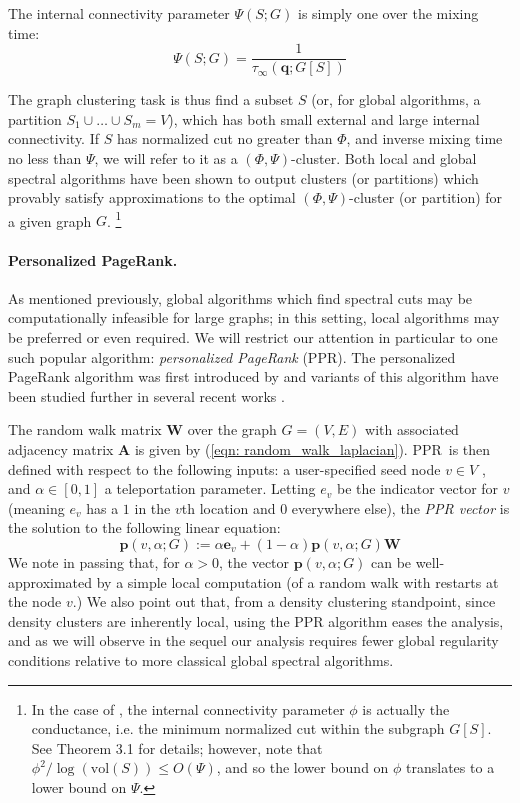 \documentclass{article}
\newcommand{\vol}{\mathrm{vol}}
\newcommand{\1}{\mathbf{1}}
\newcommand{\pbf}{\mathbf{p}}
\newcommand{\qbf}{\mathbf{q}}
\newcommand{\ebf}[1]{\mathbf{e}_{#1}}
\newcommand{\Abf}{\mathbf{A}}
\newcommand{\Wbf}{\mathbf{W}}
\newcommand{\ppr}{{\sc PPR}}
\newcommand{\pprspace}{{\sc PPR~}}
\theoremstyle{aldenthm}
\theoremstyle{aldenrmrk}
\begin{document}
The internal connectivity parameter $\Psi(S; G)$ is simply one over the mixing time:
\begin{equation}
\label{eqn: inv_mixing_time}
\Psi(S; G) = \frac{1}{\tau_{\infty}(\qbf; G[S])}
\end{equation}

The graph clustering task is thus find a subset $S$ (or, for global algorithms, a partition $S_1 \cup \ldots \cup S_m = V$), which has both small external and large internal connectivity. If $S$ has normalized cut no greater than $\Phi$, and inverse mixing time no less than $\Psi$, we will refer to it as a $(\Phi,\Psi)$-cluster. Both local \cite{zhu2013} and global \cite{kannan04} spectral algorithms have been shown to output clusters (or partitions) which provably satisfy approximations to the optimal $(\Phi, \Psi)$-cluster (or partition) for a given graph $G$. \footnote{In the case of \cite{kannan04}, the internal connectivity parameter $\phi$ is actually the conductance, i.e. the minimum normalized cut within the subgraph $G[S]$. See Theorem 3.1 for details; however, note that $\phi^2 / \log(\vol(S)) \leq O(\Psi)$, and so the lower bound on $\phi$ translates to a lower bound on $\Psi$.}

\paragraph{Personalized PageRank.}
As mentioned previously, global algorithms which find spectral cuts may be computationally infeasible for large graphs; in this setting, local algorithms may be preferred or even required. We will restrict our attention in particular to one such popular algorithm: \emph{personalized PageRank} (\ppr). The personalized PageRank algorithm was first introduced by \cite{haveliwala2003} and variants of this algorithm have been studied further in several recent works \citep{spielman2011,spielman2014,zhu2013,anderson2006,mahoney2012}. 

The random walk matrix $\Wbf$ over the graph $G = (V,E)$ with associated adjacency matrix $\Abf$ is given by (\ref{eqn: random_walk_laplacian}). \pprspace is then defined with respect to the following inputs: a user-specified seed node $v \in V$ , and  $\alpha \in [0,1]$ a teleportation parameter. Letting $e_{v}$ be the indicator vector for $v$ (meaning $e_v$ has a $1$ in the $v$th location and $0$ everywhere else), the \emph{PPR vector} is the solution to the following linear equation:
\begin{equation}
\label{eqn: ppr_vector}
\pbf(v,\alpha;G) := \alpha \ebf{v} + (1 - \alpha) \pbf(v,\alpha;G) \Wbf
\end{equation}
We note in passing that, for $\alpha > 0$, the vector $\pbf(v,\alpha;G)$ can be well-approximated by a simple local computation (of a random walk with restarts at the node $v$.) We also point out that, from a density clustering standpoint, since density clusters are inherently local, using the PPR algorithm eases the analysis, and as we will observe in the sequel our analysis requires fewer global regularity conditions relative to more classical global spectral algorithms. 
\end{document}
